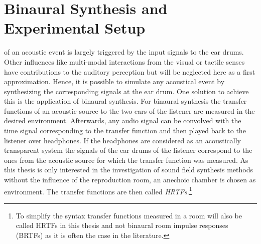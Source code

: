 \def \GITHUB {\GITHUBBASE/04_binaural_synthesis}
\graphicspath{%
{\PATH/\CHAPFOUR/fig4_01/}%
{\PATH/\CHAPFOUR/fig4_02/}%
{\PATH/\CHAPFOUR/fig4_03/}%
{\PATH/\CHAPFOUR/fig4_04/}%
{\PATH/\CHAPFOUR/fig4_05/}%
{\PATH/\CHAPFOUR/fig4_06/}%
{\PATH/\CHAPFOUR/fig4_07/}%
{\PATH/\CHAPFOUR/fig4_08/}%
{\PATH/\CHAPFOUR/fig4_09/}%
}


\chapter{Binaural Synthesis and Experimental Setup}
\label{cha:binaural}

 of an acoustic event is largely triggered by the input
signals to the ear drums. Other influences like multi-modal interactions from the
visual or tactile senses have contributions to the auditory perception but
will be neglected here as a first approximation. Hence, it is possible to simulate any
acoustical event by synthesizing the corresponding signals at the ear
drum.\autocite{Moller1992} One
solution to achieve this is the application of binaural synthesis. For binaural
synthesis the transfer functions of an acoustic source 
to the two ears of the listener are measured in the desired environment.
Afterwards, any audio signal can be
convolved with the time signal corresponding to the transfer function and then played
back to the listener over headphones. If the headphones are considered as
an acoustically transparent system the signals of the ear drums of the listener
correspond to the ones from the acoustic source for which the transfer function was measured.
As this thesis is only interested in the investigation of sound field synthesis
methods without the influence of the reproduction room, an anechoic chamber is
chosen as environment. The transfer functions are then called
\emph{\acfp{HRTF}}.\footnote{To simplify the syntax
transfer functions measured in a room will also be called \acp{HRTF} in this
thesis and not binaural room impulse responses (BRTFs) as it is often the case
in the literature.}
%
